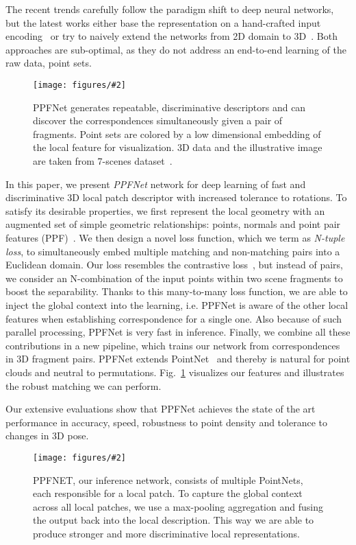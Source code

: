 \documentclass[10pt,twocolumn,letterpaper]{article}
\theoremstyle{break}
\newcommand{\insertimageC}[5]{ \begin{figure}[#5]
\centering
\texttt{[image: figures/\#2]}
\caption{#3}
\label{#4}
\vspace{-2mm}
\end{figure}
}
\newcommand{\insertimageStar}[5]{ \begin{figure*}[#5]
\centering
\texttt{[image: figures/\#2]}
\caption{#3}
\label{#4}
\vspace{-2mm}
\end{figure*}
}
\begin{document}
The recent trends carefully follow the paradigm shift to deep neural networks, but the latest works either base the representation on a hand-crafted input encoding~\cite{Khoury_2017_ICCV} or try to naively extend the networks from 2D domain to 3D~\cite{zeng20163dmatch}. Both approaches are sub-optimal, as they do not address an end-to-end learning of the raw data, point sets.

\insertimageC{1}{teaser2_300_cropped.pdf}{PPFNet generates repeatable, discriminative descriptors and can discover the correspondences simultaneously given a pair of fragments.  Point sets are colored by a low dimensional embedding of the local feature for visualization. 3D data and the illustrative image are taken from 7-scenes dataset~\cite{shotton2013scene}.}{fig:teaser}{t!}

In this paper, we present \textit{PPFNet} network for deep learning of fast and discriminative 3D local patch descriptor with increased tolerance to rotations. To satisfy its desirable properties, we first represent the local geometry with an augmented set of simple geometric relationships: points, normals and point pair features (PPF)~\cite{rusu2009fast,drost2010model}. We then design a novel loss function, which we term as \textit{N-tuple loss}, to simultaneously embed multiple matching and non-matching pairs into a Euclidean domain. Our loss resembles the contrastive loss~\cite{hadsell2006dimensionality}, but instead of pairs, we consider an N-combination of the input points within two scene fragments to boost the separability. Thanks to this many-to-many loss function, we are able to inject the global context into the learning, i.e. PPFNet is aware of the other local features when establishing correspondence for a single one. Also because of such parallel processing, PPFNet is very fast in inference. Finally, we combine all these contributions in a new pipeline, which trains our network from correspondences in 3D fragment pairs. PPFNet extends PointNet~\cite{qi2016pointnet} and thereby is natural for point clouds and neutral to permutations. Fig.~\ref{fig:teaser} visualizes our features and illustrates the robust matching we can perform. 

Our extensive evaluations show that PPFNet achieves the state of the art performance in accuracy, speed, robustness to point density and tolerance to changes in 3D pose.
 \insertimageStar{1}{drawing_inference_cropped.pdf}{PPFNET, our inference network, consists of multiple PointNets, each responsible for a local patch. To capture the global context across all local patches, we use a max-pooling aggregation and fusing the output back into the local description. This way we are able to produce stronger and more discriminative local representations.}{fig:ppfnet}{t!}
\end{document}
